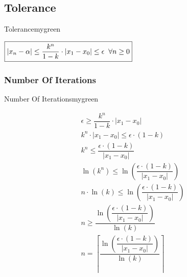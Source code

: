 \vspace{0.5cm}

\subsection{Tolerance}
\begin{prettyBox}{Tolerance}{mygreen}
\begin{center}
    \(\boxed{|x_n - \alpha| \leq \dfrac{k^{n}}{1-k} \cdot |x_1-x_0| \leq \epsilon \hspace{0.2cm} \forall n\geq 0}\)
\end{center}
\end{prettyBox}



\vspace{0.5cm}

\subsubsection{Number Of Iterations}
\begin{prettyBox}{Number Of Iterations}{mygreen}
    
    \begin{center}
    \[
    \begin{gathered}
        \epsilon \geq \dfrac{k^{n}}{1-k} \cdot |x_1-x_0| \\[0.3cm]
         k^{n} \cdot |x_1 - x_0| \leq \epsilon \cdot (1-k)   \\[0.3cm]
         k^{n}  \leq \dfrac{\epsilon \cdot (1-k)}{|x_1 - x_0|}   \\[0.3cm]
         \ln(k^{n}) \leq \ln\left(\dfrac{\epsilon \cdot (1-k)}{|x_1 - x_0|}\right)   \\[0.3cm]
         n\cdot\ln(k) \leq \ln\left(\dfrac{\epsilon \cdot (1-k)}{|x_1 - x_0|}\right)   \\[0.3cm]
         n \geq \dfrac{\ln\left(\dfrac{\epsilon \cdot (1-k)}{|x_1 - x_0|}\right)}{\ln(k)}   \\[0.3cm]
         \boxed{n =  \left\lceil \dfrac{\ln\left(\dfrac{\epsilon \cdot (1-k)}{|x_1 - x_0|}\right)}{\ln(k)}\right\rceil}   \\[0.3cm]
    \end{gathered}
    \]
    \end{center}
\end{prettyBox}
\vspace{0.25cm}



\vspace{0.5cm}
